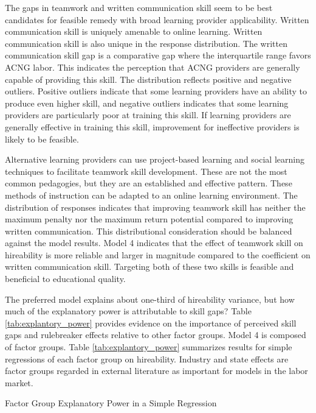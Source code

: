 \documentclass[review]{elsarticle}
\begin{document}
The gaps in teamwork and written communication skill seem to be best candidates for
feasible remedy with broad learning provider applicability.
Written communication skill is uniquely amenable to online learning.
Written communication skill is also unique in the response distribution.
The written communication skill gap is a comparative gap where the interquartile range favors ACNG labor.
This indicates the perception that ACNG providers are generally capable of providing this skill.
The distribution reflects positive and negative outliers.
Positive outliers indicate that some learning providers have an ability to produce even higher skill,
and negative outliers indicates that some learning providers are particularly poor at training this skill.
If learning providers are generally effective in training this skill,
improvement for ineffective providers is likely to be feasible.

Alternative learning providers can use project-based learning and social learning
techniques to facilitate teamwork skill development.
These are not the most common pedagogies, but they are an established and effective pattern.
These methods of instruction can be adapted to an online learning environment.
The distribution of responses indicates that improving teamwork skill has neither the maximum
penalty nor the maximum return potential compared to improving written communication.
This distributional consideration should be balanced against the model results.
Model 4 indicates that the effect of teamwork skill on hireability is more reliable
and larger in magnitude compared to the coefficient on written communication skill.
Targeting both of these two skills is feasible and beneficial to educational quality.

The preferred model explains about one-third of hireability variance,
but how much of the explanatory power is attributable to skill gaps?
Table \ref{tab:explantory_power} provides evidence on the importance of perceived skill gaps and rulebreaker effects
relative to other factor groups.
Model 4 is composed of factor groups.
Table \ref{tab:explantory_power} summarizes results for simple regressions of each factor group on hireability.
Industry and state effects are factor groups regarded in external literature as important for models in the labor market.

\begin{table}
    \caption{Factor Group Explanatory Power in a Simple Regression}
    \resizebox{\columnwidth}{!}{
        
    }
    \label{tab:explantory_power}
\end{table}
\end{document}
